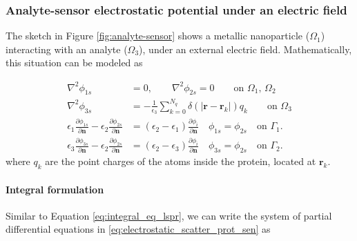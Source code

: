 \newpage
\subsubsection{Analyte-sensor electrostatic potential under an electric field}


The sketch in Figure \ref{fig:analyte-sensor} shows a metallic nanoparticle ($\Omega_1$) interacting with an analyte ($\Omega_3$), under an external electric field.
Mathematically, this situation can be modeled as

\begin{align}\label{eq:electrostatic_scatter_prot_sen}
\nabla^2 \phi_{1s} &= 0, \qquad \nabla^2 \phi_{2s} = 0 \qquad\text{on $\Omega_1$, $\Omega_2$} \nonumber\\
\nabla^2 \phi_{3s} &= -\frac{1}{\epsilon_3} \sum_{k=0}^{N_q} \delta(|\mathbf{r}-\mathbf{r}_k|) q_k \qquad\text{on $\Omega_3$} \nonumber \\
\epsilon_1\frac{\partial\phi_{1s}}{\partial \mathbf{n}} - \epsilon_2\frac{\partial\phi_{2s}}{\partial\mathbf{n}} &= (\epsilon_2-\epsilon_1)\frac{\partial\phi_i}{\partial\mathbf{n}} \quad \phi_{1s} = \phi_{2s} \quad \text{on $\Gamma_1$}. \nonumber\\
\epsilon_3\frac{\partial\phi_{3s}}{\partial \mathbf{n}} - \epsilon_2\frac{\partial\phi_{2s}}{\partial\mathbf{n}} &= (\epsilon_2-\epsilon_3)\frac{\partial\phi_i}{\partial\mathbf{n}} \quad \phi_{3s} = \phi_{2s} \quad \text{on $\Gamma_2$}.
\end{align}
%
where $q_k$ are the point charges of the atoms inside the protein, located at $\mathbf{r}_k$.

\paragraph{Integral formulation}

Similar to Equation \eqref{eq:integral_eq_lspr}, we can write the system of partial differential equations in \eqref{eq:electrostatic_scatter_prot_sen} as


